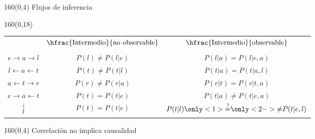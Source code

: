 \documentclass[shownotes,aspectratio=169]{beamer}
\begin{document}
\begin{frame}[plain]
\begin{textblock}{160}(0,4)
\centering \Large Flujos de inferencia
\end{textblock}

\begin{textblock}{160}(0,18)
\centering
 \begin{tabular}{c c|c}
 & $\hfrac{\text{Intermedio}}{\text{no observable}}$ &   $\hfrac{\text{Intermedio}}{\text{observable}}$ \\
 & & \\
 $ e \rightarrow a \rightarrow l $    & $P(l) \neq P(l|e)$ & $P(l|a) \overset{\phantom{?}}{=} P(l|e,a)$ \\ 
 $ l \leftarrow a \leftarrow t $      &  $P(t) \neq P(t|l)$  & $P(t|a) \overset{\phantom{?}}{=} P(t|a,l)$ \\ 
 $ a \leftarrow t \rightarrow r $     & $P(r) \neq P(r|a)$ & $P(r|t) \overset{\phantom{?}}{=} P(r|t,a)$ \\
 $ e \rightarrow a \leftarrow t $     & $P(t) \overset{\phantom{?}}{=}  P(t|e)$ & $P(t|a) \neq P(t|e,a)$ \\
            $\overset{\downarrow}{l}$  & $P(t) \overset{\phantom{?}}{=}  P(t|e)$ & $P(t|l) \only<1>{\overset{?}{=}}\only<2->{\neq} P(t|e,l)$
 \end{tabular} 
 \end{textblock}

 
 
\end{frame}


\begin{frame}[plain]
\begin{textblock}{160}(0,4)
\centering \Large Correlación no implica causalidad
\end{textblock}
\vspace{0.7cm}

 
 

\end{frame}
\end{document}
